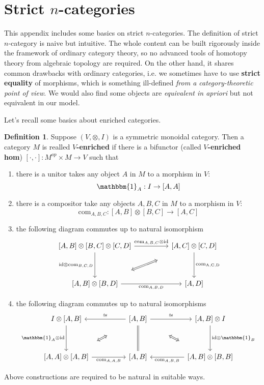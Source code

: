 \documentclass{article}
\theoremstyle{definition}
\newtheorem{mydef}{Definition}[section]
\theoremstyle{remark}
\begin{document}
\section{Strict $n$-categories}

This appendix includes some basics on strict $n$-categories. The definition of strict $n$-category is naive but intuitive. The whole content can be built rigorously inside the framework of ordinary category theory, so no advanced tools of homotopy theory from algebraic topology are required. On the other hand, it shares common drawbacks with ordinary categories, i.e. we sometimes have to use \textbf{strict equality} of morphisms, which is something ill-defined \textit{from a category-theoretic point of view}. We would also find some objects are \textit{equivalent in apriori} but not equivalent in our model.

Let's recall some basics about enriched categories.

\begin{mydef}
Suppose $(V,\otimes,I)$ is a symmetric monoidal category. Then a category $M$ is realled \textbf{$V$-enriched} if there is a bifunctor (called \textbf{$V$-enriched hom}) $[\cdot,\cdot]:M^{op}\times M \to V$ such that 

\begin{enumerate}
    \item there is a unitor takes any object $A$ in $M$ to a morphism in $V$: $$ \mathbbm{1}_A: I \to [A,A] $$ 
    \item there is a compositor take any objects $A,B,C$ in $M$ to a morphism in $V$: $$ \mathrm{com}_{A,B,C}:[A,B] \otimes [B,C] \to [A,C]$$
    \item the following diagram commutes up to natural isomorphism $$ \begin{tikzcd}[column sep=huge,row sep=huge] {[A,B] \otimes [B,C] \otimes [C,D]} \arrow[d, "{\mathrm{id} \otimes\mathrm{com}_{B,C,D}}"'] \arrow[r, "{\mathrm{com}_{A,B,C}\otimes \mathrm{id}}"] & {[A,C] \otimes [C,D]} \arrow[d, "{\mathrm{com_{A,C,D}}}"] \\ {[A,B] \otimes [B,D]} \arrow[r, "{\mathrm{com}_{A,B,D}}"'] \arrow[shorten <=30pt,shorten >=30pt,ru,Leftrightarrow]& {[A,D]} \end{tikzcd}$$
    \item the following diagram commutes up to natural isomorphisms $$ \begin{tikzcd}[column sep=huge,row sep=huge] {I \otimes [A,B]} \arrow[d, "\mathbbm{1}_A \otimes \mathrm{id}"'] & {[A,B]} \arrow[d,equal] \arrow[l, "\cong"'] \arrow[r, "\cong"] \arrow[shorten <=30pt,shorten >=30pt,ld,Leftrightarrow] \arrow[shorten <=30pt,shorten >=30pt,rd,Leftrightarrow] & {[A,B] \otimes I} \arrow[d, "\mathrm{id} \otimes\mathbbm{1}_B"] \\ {[A,A]\otimes [A,B]} \arrow[r, "{\mathrm{com}_{A,A,B}}"']   & {[A,B]} & {[A,B] \otimes [B,B]} \arrow[l, "{\mathrm{com}_{A,B,B}}"] \end{tikzcd}$$
\end{enumerate} 
Above constructions are required to be natural in suitable ways.

\end{mydef}
\end{document}
